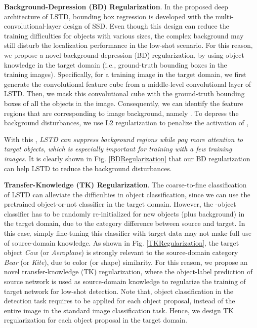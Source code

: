 \documentclass[letterpaper]{article} \usepackage{aaai18}  \usepackage{times}  \usepackage{helvet}  \usepackage{courier}  \usepackage{url}  \usepackage{graphicx}
\begin{document}
\textbf{Background-Depression (BD) Regularization}.
In the proposed deep architecture of LSTD,
bounding box regression is developed with the multi-convolutional-layer design of SSD.
Even though this design can reduce the training difficulties for objects with various sizes,
the complex background may still disturb the localization performance in the low-shot scenario.
For this reason,
we propose a novel background-depression (BD) regularization,
by using object knowledge in the target domain (i.e., ground-truth bounding boxes in the training images).
Specifically,
for a training image in the target domain,
we first generate the convolutional feature cube from a middle-level convolutional layer of LSTD.
Then,
we mask this convolutional cube with the ground-truth bounding boxes of all the objects in the image.
Consequently,
we can identify the feature regions that are corresponding to image background,
namely .
To depress the background disturbances,
we use L2 regularization to penalize the activation of ,

With this ,
\textit{LSTD can suppress background regions while pay more attention to target objects,
which is especially important for training with a few training images}.
It is clearly shown in Fig. \ref{BDRegularization} that our BD regularization can help LSTD to reduce the background disturbances.




\textbf{Transfer-Knowledge (TK) Regularization}.
The coarse-to-fine classification of LSTD can alleviate the difficulties in object classification,
since we can use the pretrained object-or-not classifier in the target domain.
However,
the -object classifier has to be randomly re-initialized for  new objects (plus background) in the target domain,
due to the category difference between source and target.
In this case,
simply fine-tuning this classifier with target data may not make full use of source-domain knowledge.
As shown in Fig. \ref{TKRegularization},
the target object \textit{Cow} (or \textit{Aeroplane}) is strongly relevant to the source-domain category \textit{Bear} (or \textit{Kite}),
due to color (or shape) similarity.
For this reason,
we propose an novel transfer-knowledge (TK) regularization,
where
the object-label prediction of source network is used as source-domain knowledge to regularize the training of target network for low-shot detection.
Note that,
object classification in the detection task requires to be applied for each object proposal,
instead of the entire image in the standard image classification task.
Hence,
we design TK regularization for each object proposal in the target domain.
\end{document}
